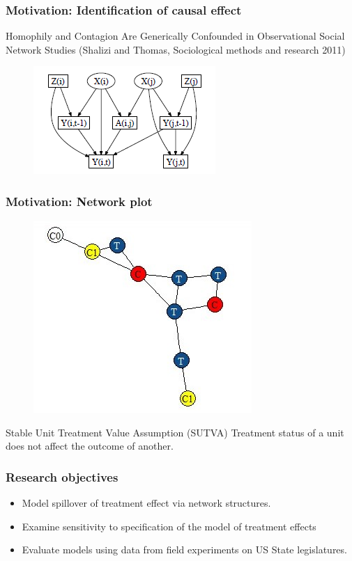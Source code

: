 \documentclass{beamer}
\begin{document}
\begin{frame}
\frametitle{Motivation: Identification of causal effect}
Homophily and Contagion Are Generically Confounded in Observational Social Network Studies (Shalizi and Thomas, Sociological methods and research 2011)
\begin{figure}
\includegraphics[width=0.7\linewidth]{Shalizi_diagram.png}
\end{figure}
\end{frame}


\begin{frame}
\frametitle{Motivation: Network plot}
\vspace{-5mm}
\begin{figure}
\centering
\includegraphics[width=0.5\linewidth]{Dummy_network.jpg}
\end{figure}

\vspace{-0.15cm}
\begin{block}{Stable Unit Treatment Value Assumption (SUTVA)}
Treatment status of a unit does not affect the outcome of another.
\end{block}
\end{frame}


\begin{frame}
\frametitle{Research objectives}
\begin{itemize}
\item {\LARGE Model spillover of treatment effect via network structures.}
\vspace{5mm}
\item {\LARGE Examine sensitivity to specification of the model of treatment effects}
\vspace{5mm}
\item {\LARGE Evaluate models using data from field experiments on US State legislatures.}
\end{itemize}
\end{frame}
\end{document}
